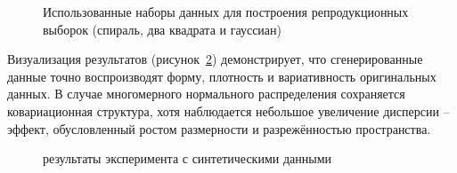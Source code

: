 \begin{figure}[ht]
    \caption{Использованные наборы данных для построения репродукционных выборок (спираль, два квадрата и гауссиан)}
    \label{fig:synthetic_datasets}
\end{figure}

Визуализация результатов (рисунок~\cref{fig:synthetic_results}) демонстрирует, что сгенерированные данные точно воспроизводят форму, плотность и вариативность оригинальных данных. В случае многомерного нормального распределения сохраняется ковариационная структура, хотя наблюдается небольшое увеличение дисперсии -- эффект, обусловленный ростом размерности и разрежённостью пространства.

\begin{figure}[ht]
    \caption{результаты эксперимента с синтетическими данными}
    \label{fig:synthetic_results}
\end{figure}

